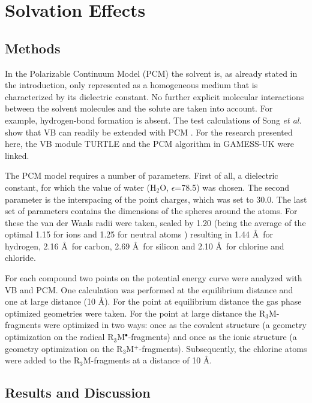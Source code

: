 \section{\label{ch3.sec.solv}Solvation Effects}

\subsection{Methods}

In the Polarizable Continuum Model (PCM) the solvent is, as already stated in the introduction, only represented as a homogeneous medium that is characterized by its dielectric constant. No further explicit molecular interactions between the solvent molecules and the solute are taken into account. For example, hydrogen-bond formation is absent. The test calculations of Song \textit{et al.} show that VB can readily be extended with PCM \cite{song}. For the research presented here, the VB module TURTLE and the PCM algorithm in GAMESS-UK were linked. 

The PCM model requires a number of parameters. First of all, a dielectric constant, for which the value of water (H$_2$O, $\epsilon$=78.5) was chosen. The second parameter is the interspacing of the point charges, which was set to 30.0\degrees. The last set of parameters contains the dimensions of the spheres around the atoms. For these the van der Waals radii \cite{bondi} were taken, scaled by 1.20 (being the average of the optimal 1.15 for ions and 1.25 for neutral atoms \cite{scaling}) resulting in 1.44 \AA\  for hydrogen, 2.16 \AA\  for carbon, 2.69 \AA\ for silicon and 2.10 \AA\ for chlorine and chloride.

For each compound two points on the potential energy curve were analyzed with VB and PCM. One calculation was performed at the equilibrium distance and one at large distance (10 \AA). For the point at equilibrium distance the gas phase optimized geometries were taken. For the point at large distance the R$_3$M-fragments were optimized in two ways: once as the covalent structure (a geometry optimization on the radical R$_3$M$^\bullet$-fragments) and once as the ionic structure (a geometry optimization on the R$_3$M$^{+}$-fragments). Subsequently, the chlorine atoms were added to the R$_3$M-fragments at a distance of 10 \AA. 

\subsection{Results and Discussion}


